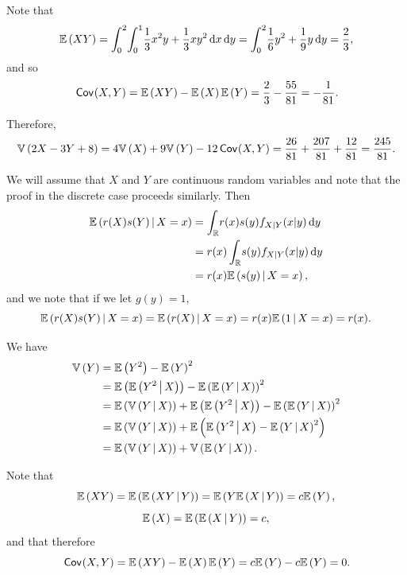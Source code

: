 \begin{ex}
  Note that
  \begin{align*}
    \E{XY}
    =\int_0^2\!\int_0^1\!\frac{1}{3}x^2y+\frac{1}{3}xy^2\,\d{x}\,\d{y}
    =\int_0^2\!\frac{1}{6}y^2+\frac{1}{9}y\,\d{y}
    =\frac{2}{3},
  \end{align*}
  and so
  \begin{align*}
    \cov{X,Y}=\E{XY}-\E{X}\E{Y}=\frac{2}{3} - \frac{55}{81}=-\frac{1}{81}.
  \end{align*}

  Therefore,
  \begin{align*}
    \var{2X-3Y+8}
    =4\var{X}+9\var{Y}-12\cov{X,Y}
    =\frac{26}{81}+\frac{207}{81} +\frac{12}{81}
    =\frac{245}{81}.
  \end{align*}

\end{ex}

\begin{ex}
  We will assume that $X$ and $Y$ are continuous random variables and note that
  the proof in the discrete case proceeds similarly. Then
  \begin{align*}
    \cE{r(X)s(Y)}{X=x}
     & =\int_\R\!r(x)s(y)f_{X|Y}(x|y)\,\d{y} \\
     & =r(x)\int_\R\!s(y)f_{X|Y}(x|y)\,\d{y} \\
     & =r(x)\cE{s(y)}{X=x},
  \end{align*}
  and we note that if we let $g(y)=1$,
  \[
    \cE{r(X)s(Y)}{X=x}
    =\cE{r(X)}{X=x}
    =r(x)\cE{1}{X=x}=r(x).
  \]
\end{ex}

\begin{ex}
  We have
  \begin{align*}
    \var{Y}
     & =\E{Y^2}-\E{Y}^2                                   \\
     & =\E{\cE{Y^2}{X}}-\E{\cE{Y}{X}}^2                   \\
     & =\E{\var{Y\,|\,X}}+\E{\cE{Y^2}{X}}-\E{\cE{Y}{X}}^2 \\
     & =\E{\var{Y\,|\,X}}+\E{\cE{Y^2}{X}-\cE{Y}{X}^2}     \\
     & =\E{\var{Y\,|\,X}}+\var{\cE{Y}{X}}.
  \end{align*}
\end{ex}

\begin{ex}
  Note that
  \[
    \E{XY}
    =\E{\cE{XY}{Y}}
    =\E{Y\cE{X}{Y}}
    =c\E{Y},
  \]
  \[
    \E{X}
    =\E{\cE{X}{Y}}
    =c,
  \]
  and that therefore
  \[
    \cov{X,Y}
    =\E{XY}-\E{X}\E{Y}
    =c\E{Y}-c\E{Y}
    =0.
  \]
\end{ex}

